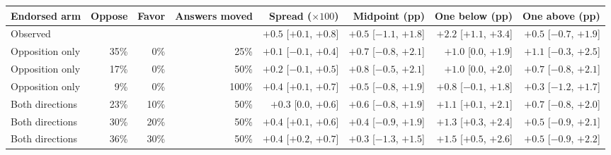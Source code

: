 \begin{tabular}{lrrrrrrr}
\toprule
Endorsed arm & Oppose & Favor & Answers moved & Spread ($\times 100$) & Midpoint (pp) & One below (pp) & One above (pp) \\
\midrule
Observed &  &  &  & $+0.5$ [$+0.1$, $+0.8$] & $+0.5$ [$-1.1$, $+1.8$] & $+2.2$ [$+1.1$, $+3.4$] & $+0.5$ [$-0.7$, $+1.9$] \\
\midrule
Opposition only & 35\% & 0\% & 25\% & $+0.1$ [$-0.1$, $+0.4$] & $+0.7$ [$-0.8$, $+2.1$] & $+1.0$ [$0.0$, $+1.9$] & $+1.1$ [$-0.3$, $+2.5$] \\
Opposition only & 17\% & 0\% & 50\% & $+0.2$ [$-0.1$, $+0.5$] & $+0.8$ [$-0.5$, $+2.1$] & $+1.0$ [$0.0$, $+2.0$] & $+0.7$ [$-0.8$, $+2.1$] \\
Opposition only & 9\% & 0\% & 100\% & $+0.4$ [$+0.1$, $+0.7$] & $+0.5$ [$-0.8$, $+1.9$] & $+0.8$ [$-0.1$, $+1.8$] & $+0.3$ [$-1.2$, $+1.7$] \\
\midrule
Both directions & 23\% & 10\% & 50\% & $+0.3$ [$0.0$, $+0.6$] & $+0.6$ [$-0.8$, $+1.9$] & $+1.1$ [$+0.1$, $+2.1$] & $+0.7$ [$-0.8$, $+2.0$] \\
Both directions & 30\% & 20\% & 50\% & $+0.4$ [$+0.1$, $+0.6$] & $+0.4$ [$-0.9$, $+1.9$] & $+1.3$ [$+0.3$, $+2.4$] & $+0.5$ [$-0.9$, $+2.1$] \\
Both directions & 36\% & 30\% & 50\% & $+0.4$ [$+0.2$, $+0.7$] & $+0.3$ [$-1.3$, $+1.5$] & $+1.5$ [$+0.5$, $+2.6$] & $+0.5$ [$-0.9$, $+2.2$] \\
\bottomrule
\end{tabular}
